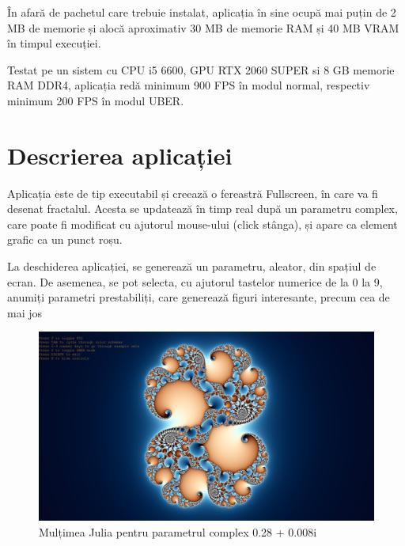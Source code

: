 \documentclass[12pt]{report}
\begin{document}
În afară de pachetul care trebuie instalat, aplicația în sine ocupă mai puțin de 2 MB de memorie și alocă aproximativ 30 MB de memorie RAM și 40 MB VRAM în timpul execuției.

Testat pe un sistem cu CPU i5 6600, GPU RTX 2060 SUPER si 8 GB memorie RAM DDR4, aplicația redă minimum 900 FPS în modul normal,
respectiv minimum 200 FPS în modul UBER.

\chapter{Descrierea aplicației}

Aplicația este de tip executabil și creează o fereastră Fullscreen, în care va fi desenat fractalul.
Acesta se updatează în timp real după un parametru complex, care poate fi modificat cu ajutorul mouse-ului (click stânga),
și apare ca element grafic ca un punct roșu.

La deschiderea aplicației, se generează un parametru, aleator, din spațiul de ecran. De asemenea, se pot selecta, cu ajutorul tastelor numerice de la 0 la 9,
anumiți parametri prestabiliți, care generează figuri interesante, precum cea de mai jos
\begin{figure}[h]
	\centering
	\includegraphics[width=\textwidth]{Images/example1.png}
	\caption{Mulțimea Julia pentru parametrul complex 0.28 + 0.008i}
\end{figure}
\\
\end{document}
